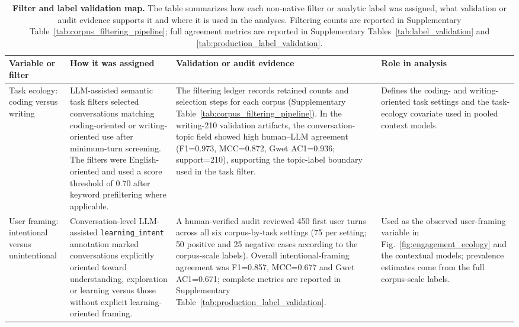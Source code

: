 \begin{table}
\fontsize{7.2pt}{8.4pt}\selectfont
\centering
\caption{\textbf{Filter and label validation map.} The table summarizes how each non-native filter or analytic label was assigned, what validation or audit evidence supports it and where it is used in the analyses. Filtering counts are reported in Supplementary Table~\ref{tab:corpus_filtering_pipeline}; full agreement metrics are reported in Supplementary Tables~\ref{tab:label_validation} and \ref{tab:production_label_validation}.}
\label{tab:filter_classifier_validation}
\setlength{\tabcolsep}{4pt}
\renewcommand{\arraystretch}{1.12}
\begin{tabularx}{\textheight}{>{\raggedright\arraybackslash}p{0.15\textheight}>{\raggedright\arraybackslash}p{0.24\textheight}>{\raggedright\arraybackslash}p{0.25\textheight}>{\raggedright\arraybackslash}X}
\toprule
Variable or filter & How it was assigned & Validation or audit evidence & Role in analysis \\
\midrule
Task ecology: coding versus writing & LLM-assisted semantic task filters selected conversations matching coding-oriented or writing-oriented use after minimum-turn screening. The filters were English-oriented and used a score threshold of 0.70 after keyword prefiltering where applicable. & The filtering ledger records retained counts and selection steps for each corpus (Supplementary Table~\ref{tab:corpus_filtering_pipeline}). In the writing-210 validation artifacts, the conversation-topic field showed high human--LLM agreement (F1=0.973, MCC=0.872, Gwet AC1=0.936; support=210), supporting the topic-label boundary used in the task filter. & Defines the coding- and writing-oriented task settings and the task-ecology covariate used in pooled context models. \\
\addlinespace
User framing: intentional versus unintentional & Conversation-level LLM-assisted \texttt{learning\_intent} annotation marked conversations explicitly oriented toward understanding, exploration or learning versus those without explicit learning-oriented framing. & A human-verified audit reviewed 450 first user turns across all six corpus-by-task settings (75 per setting; 50 positive and 25 negative cases according to the corpus-scale labels). Overall intentional-framing agreement was F1=0.857, MCC=0.677 and Gwet AC1=0.671; complete metrics are reported in Supplementary Table~\ref{tab:production_label_validation}. & Used as the observed user-framing variable in Fig.~\ref{fig:engagement_ecology} and the contextual models; prevalence estimates come from the full corpus-scale labels. \\

\end{tabularx}
\end{table}

